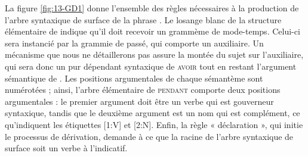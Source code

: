 {La figure \ref{fig:13-GD1} donne l’ensemble des règles nécessaires à la production de l’arbre syntaxique de surface de la phrase . Le losange blanc de la structure élémentaire de  indique qu’il doit recevoir un grammème de mode-temps. Celui-ci sera instancié par la grammie de passé, qui comporte un auxiliaire. Un mécanisme que nous ne détaillerons pas assure la montée du sujet sur l’auxiliaire, qui sera donc un pur dépendant syntaxique de \textsc{avoir} tout en restant l’argument sémantique de . Les positions argumentales de chaque sémantème sont numérotées ; ainsi, l’arbre élémentaire de \textsc{pendant} comporte deux positions argumentales : le premier argument doit être un verbe qui est gouverneur syntaxique, tandis que le deuxième argument est un nom qui est complément, ce qu’indiquent les étiquettes [1{\NoAutoSpacing :}V] et [2{\NoAutoSpacing :}N]. Enfin, la règle « déclaration », qui initie le processus de dérivation, demande à ce que la racine de l’arbre syntaxique de surface soit un verbe à l’indicatif.

\begin{figure}[H]
\end{figure}}
